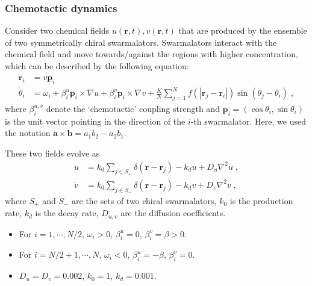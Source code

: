 \documentclass{article}
\begin{document}
\subsubsection{Chemotactic dynamics}

Consider two chemical fields $u\left( \mathbf{r},t \right), v\left( \mathbf{r},t \right)$ that are produced by the ensemble of two symmetrically chiral swarmalators. Swarmalators interact with the chemical field and move towards/against the regions with higher concentration, which can be described by the following equation:
\begin{subequations}
    \begin{align}
        \dot{\mathbf{r}}_i&=v\mathbf{p}_i\\
        \dot{\theta}_i&=\omega _i+\beta _{i}^{u}\mathbf{p}_i\times \nabla u+\beta _{i}^{v}\mathbf{p}_i\times \nabla v+\frac{K}{N}\sum_{j=1}^N{f}\left( \left| \mathbf{r}_j-\mathbf{r}_i \right| \right) \sin \left( \theta _j-\theta _i \right) \;,
    \end{align}
\end{subequations}
where $\beta _{i}^{u,v}$ denote the ‘chemotactic’ coupling strength and $\mathbf{p}_i=(\cos \theta _i,\sin \theta _i)$ is the unit vector pointing in the direction of the $i$-th swarmalator. Here, we used the notation $\mathbf{a}\times\mathbf{b}=a_1 b_2-a_2 b_1$.

These two fields evolve as
\begin{subequations}
    \begin{align}
    \dot{u}&=k_0\sum_{j\in S_+}{\delta \left( \mathbf{r}-\mathbf{r}_{j} \right)}-k_du+D_u\nabla ^2u\;,\\
    \dot{v}&=k_0\sum_{j\in S_-}{\delta \left( \mathbf{r}-\mathbf{r}_{j} \right)}-k_dv+D_v\nabla ^2v\;,
    \end{align}
\end{subequations}
where $S_+$ and $S_-$ are the sets of two chiral swarmalators, $k_0$ is the production rate, $k_d$ is the decay rate, $D_{u,v}$ are the diffusion coefficients.

\begin{itemize}
    \item For $i=1, \cdots, N/2$, $\omega_i > 0$, $\beta_i^u = 0$, $\beta_i^v = \beta > 0$.
    \item For $i=N/2+1, \cdots, N$, $\omega_i < 0$, $\beta_i^u = -\beta$, $\beta_i^v = 0$.
    \item $D_u = D_v = 0.002$, $k_0 = 1$, $k_d = 0.001$.
\end{itemize}
\end{document}
